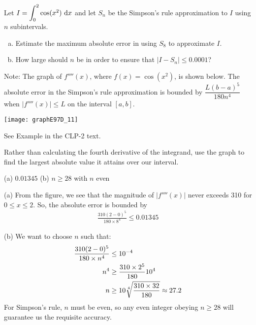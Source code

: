 \begin{question}[1997D]
Let $I={\displaystyle\int_0^2}\cos(x^2)\ \dee{x}$ and
let $S_n$ be the Simpson's rule approximation to $I$ using $n$ subintervals.
\begin{enumerate}[(a)]
\item
Estimate the maximum absolute error in using $S_8$ to approximate $I$.
\item
How large should $n$ be in order to ensure that $|I-S_n|\le 0.0001$?
\end{enumerate}
\noindent  Note: The graph of $f''''(x)$, where $f(x)=\cos(x^2)$,
is shown below. The absolute error in the Simpson's rule approximation
is bounded by $\dfrac{L(b-a)^5}{180n^4}$ when $|f''''(x)|\le L$ on the
interval $[a,b]$.

\begin{center}
       \texttt{[image: graphE97D\_11]}
\end{center}

\end{question}

\begin{hint}
See Example  in the
CLP-2 text.

Rather than calculating the fourth derivative of the integrand, use the graph to find the largest absolute value it attains over our interval.
\end{hint}

\begin{answer} (a)
$0.01345$
\qquad (b)
 $n\ge 28$ with $n$ even

\end{answer}

\begin{solution} (a)
From the figure, we see that the magnitude of $|f''''(x)|$
never exceeds 310 for $0\le x\le 2$. So, the absolute error is bounded by
\begin{align*}
\frac{310(2-0)^5}{180\times 8^4}\le 0.01345
\end{align*}

\noindent (b)
We want to choose $n$ such that:
\begin{align*}
\frac{310(2-0)^5}{180\times n^4}&\le 10^{-4}\\
n^4&\ge \frac{310\times 2^5}{180}10^4\\
n&\ge 10\root 4 \of {\frac{310\times 32}{180}}\approx27.2
\end{align*}
For Simpson's rule, $n$ must be even, so any even integer obeying
$n\ge28$ will guarantee us the requisite accuracy.

\end{solution}

